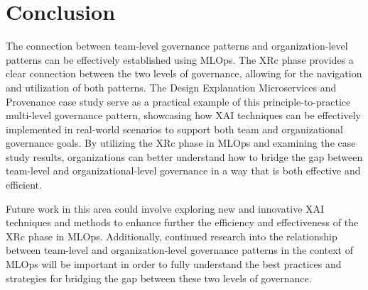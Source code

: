\documentclass[conference]{IEEEtran}
\begin{document}
\section{Conclusion}
The connection between team-level governance patterns and organization-level patterns can be effectively established using MLOps. The XRc phase provides a clear connection between the two levels of governance, allowing for the navigation and utilization of both patterns. The Design Explanation Microservices and Provenance case study serve as a practical example of this principle-to-practice multi-level governance pattern, showcasing how XAI techniques can be effectively implemented in real-world scenarios to support both team and organizational governance goals. By utilizing the XRc phase in MLOps and examining the case study results, organizations can better understand how to bridge the gap between team-level and organizational-level governance in a way that is both effective and efficient.

Future work in this area could involve exploring new and innovative XAI techniques and methods to enhance further the efficiency and effectiveness of the XRc phase in MLOps. Additionally, continued research into the relationship between team-level and organization-level governance patterns in the context of MLOps will be important in order to fully understand the best practices and strategies for bridging the gap between these two levels of governance.



\end{document}

